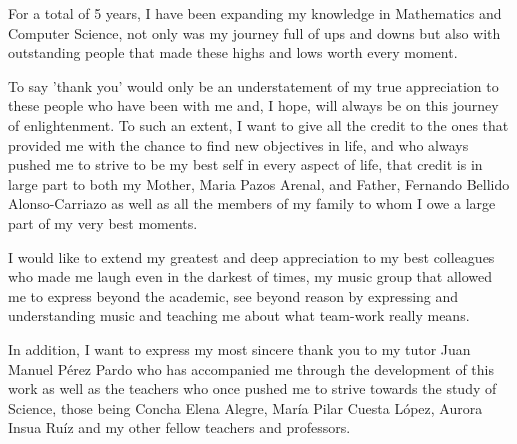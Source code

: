 For a total of 5 years, I have been expanding my knowledge in Mathematics and Computer Science, not only was my journey full of ups and downs but also with outstanding people that made these highs and lows worth every moment. 

To say 'thank you' would only be an understatement of my true appreciation to these people who have been with me and, I hope, will always be on this journey of enlightenment. To such an extent, I want to give all the credit to the ones that provided me with the chance to find new objectives in life, and who always pushed me to strive to be my best self in every aspect of life, that credit is in large part to both my Mother, Maria Pazos Arenal, and Father, Fernando Bellido Alonso-Carriazo as well as all the members of my family to whom I owe a large part of my very best moments.

I would like to extend my greatest and deep appreciation to my best colleagues who made me laugh even in the darkest of times, my music group that allowed me to express beyond the academic, see beyond reason by expressing and understanding music and teaching me about what team-work really means.

In addition, I want to express my most sincere thank you to my tutor Juan Manuel Pérez Pardo who has accompanied me through the development of this work as well as the teachers who once pushed me to strive towards the study of Science, those being Concha Elena Alegre, María Pilar Cuesta López, Aurora Insua Ruíz and my other fellow teachers and professors.

